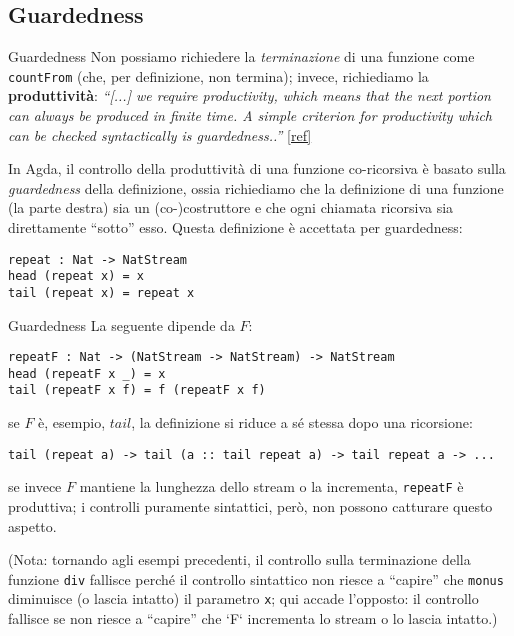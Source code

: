 \documentclass[t,aspectratio=169,9pt]{beamer}
\begin{document}
\subsection{Guardedness}
\begin{frame}[fragile]{Guardedness}
	Non possiamo richiedere la {\it terminazione} di una funzione come
	\texttt{countFrom} (che, per definizione, non termina);
	invece, richiediamo la {\bf produttività}: \textit{``[...]
	we require productivity, which means that the next portion can always be
	produced in finite time. A simple criterion for productivity which can be
	checked syntactically is guardedness..''}
	\href{https://arxiv.org/pdf/1012.4896.pdf}{[ref]}

	\vfill

	In Agda, il controllo della produttività di una funzione co-ricorsiva è basato
	sulla {\it guardedness} della definizione, ossia richiediamo che la definizione di
	una funzione (la parte destra) sia un (co-)costruttore e che ogni chiamata
	ricorsiva sia direttamente ``sotto'' esso. Questa definizione è accettata per
	guardedness:
	\begin{verbatim}
repeat : Nat -> NatStream
head (repeat x) = x 
tail (repeat x) = repeat x
\end{verbatim}
\end{frame}
\begin{frame}[fragile]{Guardedness}
	La seguente dipende da $F$:

	\begin{verbatim}
repeatF : Nat -> (NatStream -> NatStream) -> NatStream
head (repeatF x _) = x 
tail (repeatF x f) = f (repeatF x f)
\end{verbatim}

	se $F$ è, esempio, $tail$, la definizione si riduce a sé stessa dopo una ricorsione:

	\begin{verbatim}
tail (repeat a) -> tail (a :: tail repeat a) -> tail repeat a -> ...
\end{verbatim}
	se invece $F$ mantiene la lunghezza dello stream o la incrementa,
	\texttt{repeatF} è produttiva; i controlli puramente sintattici, però, non
	possono catturare questo aspetto.

	(Nota: tornando agli esempi precedenti, il controllo sulla terminazione della
	funzione \texttt{div} fallisce perché il controllo sintattico non riesce a
	``capire'' che \texttt{monus} diminuisce (o lascia intatto) il parametro
	\texttt{x}; qui accade l'opposto: il controllo fallisce se non riesce a
	``capire'' che `F` incrementa lo stream o lo lascia intatto.)
\end{frame}
\end{document}
